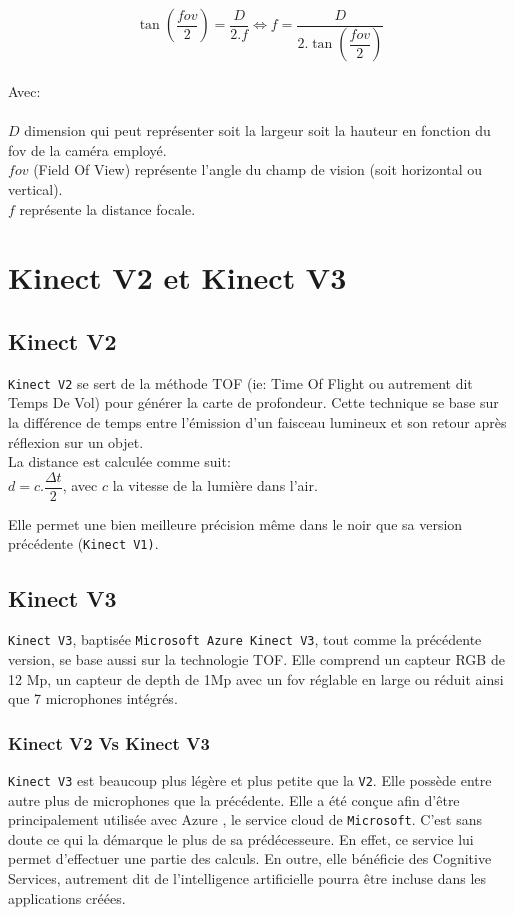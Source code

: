 \documentclass[a4paper, 12pt]{book}
\begin{document}
\begin{equation}
 \tan \left( {\dfrac{fov}{2}}\right) = \dfrac{D}{2.f}    \Leftrightarrow   f = \dfrac{D}{2. \tan \left( {\dfrac{fov}{2}}\right)}
\end{equation}
\\ Avec:\\ \\
$D$  dimension qui peut représenter soit la largeur soit la hauteur en fonction du fov de la caméra employé. \\
$fov$ (Field Of View) représente l'angle du champ de vision (soit horizontal ou vertical). \\
$f$ représente la distance focale.


\section{Kinect V2 et Kinect V3}
\subsection{Kinect V2}
\texttt{Kinect V2} se sert de la méthode TOF (ie: Time Of Flight ou autrement dit Temps De Vol) pour générer la carte de profondeur. Cette technique se base sur la différence de temps entre l'émission d'un faisceau lumineux et son retour après réflexion sur un objet. \\ La distance est calculée comme suit:\\
$ d = c.\dfrac{\Delta t}{2} $, avec $c$ la vitesse de la lumière dans l'air.\\ \par Elle permet une bien meilleure précision même dans le noir que sa version précédente (\texttt{Kinect V1)}. 

\subsection{Kinect V3}
\texttt{Kinect V3}, baptisée \texttt{Microsoft Azure Kinect V3}, tout comme la précédente version, se base aussi sur la technologie TOF. Elle comprend un capteur RGB de 12 Mp, un capteur de depth de 1Mp avec un fov réglable en large ou réduit ainsi que 7 microphones intégrés.  
 
\subsubsection{Kinect V2 Vs Kinect V3}
\texttt{Kinect V3} est beaucoup plus légère et plus petite que la \texttt{V2}. Elle possède entre autre plus de microphones que la précédente. Elle a été conçue afin d'être principalement utilisée avec Azure , le service cloud de \texttt{Microsoft}. C'est sans doute ce qui la démarque le plus de sa prédécesseure. En effet, ce service lui permet d'effectuer une partie des calculs. En outre, elle bénéficie des Cognitive Services, autrement dit de l'intelligence artificielle pourra être incluse dans les applications créées.
\end{document}
